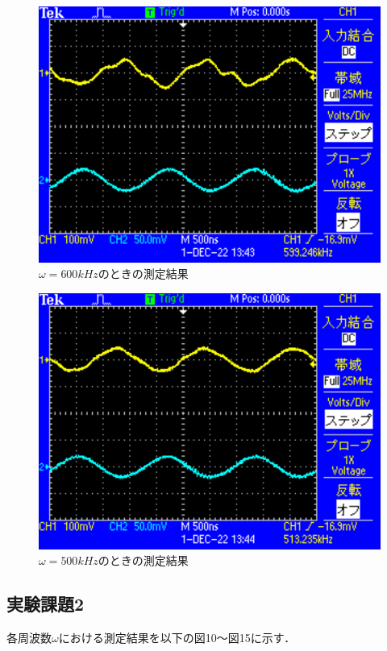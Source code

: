 \begin{figure}[H]
    \centering
    \includegraphics[scale=0.5]{TEK0005.pdf}
    \caption{$\omega=600\si{kHz}$のときの測定結果}
\end{figure}

\begin{figure}[H]
    \centering
    \includegraphics[scale=0.5]{TEK0006.pdf}
    \caption{$\omega=500\si{kHz}$のときの測定結果}
\end{figure}

\newpage

\subsection{実験課題2}
各周波数$\omega$における測定結果を以下の図10～図15に示す．

